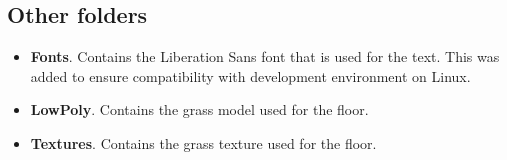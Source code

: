 \documentclass[
	emulatestandardclasses, %
	11pt,
	a4paper,
	toc=bib, %
	parskip=half-,
	numbers=endperiod,
]{scrartcl}
\begin{document}
\subsection{Other folders}

\begin{itemize}
	\item \textbf{Fonts}. Contains the Liberation Sans font that is used for the text. This was added to ensure compatibility with development environment on Linux.
	\item \textbf{LowPoly}. Contains the grass model used for the floor.
	\item \textbf{Textures}. Contains the grass texture used for the floor.
\end{itemize}
\end{document}
